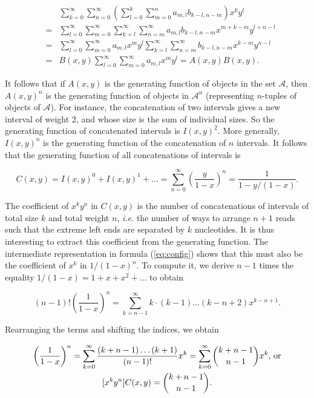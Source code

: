 \documentclass{article}
\begin{document}
\begin{eqnarray*}
&\;& \sum_{k=0}^\infty \sum_{n=0}^\infty \left( \sum_{l=0}^k \sum_{m=0}^n
  a_{m,l}b_{k-l,n-m}\right) x^k y^l  \\ 
&=& \sum_{l=0}^\infty \sum_{m=0}^\infty \sum_{k=l}^\infty \sum_{n=m}^\infty
  a_{m,l}b_{k-l,n-m}x^{m + k-m} y^{l + n-l} \\
&=& \sum_{l=0}^\infty \sum_{m=0}^\infty a_{m,l} x^m y^l
  \sum_{k=l}^\infty \sum_{n=m}^\infty
  b_{k-l,n-m}x^{k-m} y^{n-l} \\
&=& B(x,y) \sum_{l=0}^\infty \sum_{m=0}^\infty a_{m,l} x^m y^l
 = A(x,y)B(x,y).
\end{eqnarray*}

It follows that if $A(x,y)$ is the generating function of objects in the
set $\mathcal{A}$, then $A(x,y)^n$ is the generating function of objects
in $\mathcal{A}^n$ (representing $n$-tuples of objects of $\mathcal{A}$).
For instance, the concatenation of two intervals gives a new interval of
weight 2, and whose size is the sum of individual sizes. So the generating
function of concatenated intervals is $I(x,y)^2$. More generally,
$I(x,y)^n$ is the generating function of the concatenation of $n$
intervals. It follows that the generating function of all concatenations of
intervals is

\begin{equation}
\label{eq:config}
C(x,y) = I(x,y)^0 + I(x,y)^1 +\ldots
= \sum_{n=0}^\infty \left( \frac{y}{1-x} \right)^n
= \frac{1}{1 - y/(1-x)}.
\end{equation}


The coefficient of $x^ky^n$ in $C(x,y)$ is the number of concatenations of
intervals of total size $k$ and total weight $n$, \textit{i.e.} the number
of ways to arrange $n+1$ reads such that the extreme left ends are
separated by $k$ nucleotides. It is thus interesting to extract this
coefficient from the generating function. The intermediate representation
in formula (\ref{eq:config}) shows that this must also be the coefficient
of $x^k$ in $1/(1-x)^n$. To compute it, we derive $n-1$ times the equality
$1/(1-x) = 1 + x + x^2 + \ldots$ to obtain

\begin{equation*}
(n-1)! \left( \frac{1}{1-x} \right)^n =
\sum_{k=n-1}^\infty k \cdot (k-1) \ldots (k-n+2) x^{k-n+1}.
\end{equation*}

Rearranging the terms and shifting the indices, we obtain

\begin{gather}
\notag
\left( \frac{1}{1-x} \right)^n =
\sum_{k=0}^\infty \frac{(k+n-1) \ldots (k+1)}{(n-1)!} x^k
= \sum_{k=0}^\infty {k+n-1 \choose n-1} x^k \text{, or} \\
\label{eq:C}
[x^ky^n]C(x,y) = {k+n-1 \choose n-1}.
\end{gather}
\end{document}
